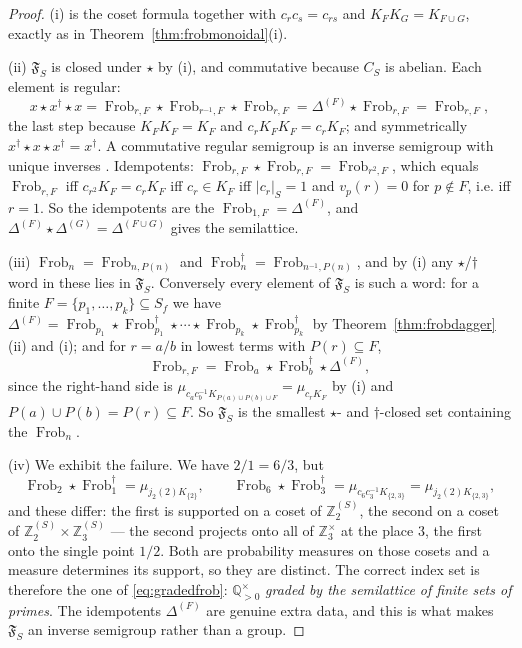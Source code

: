 \documentclass[11pt]{amsart}
\theoremstyle{definition}
\theoremstyle{remark}
\newcommand{\Z}{\mathbb Z}
\newcommand{\Q}{\mathbb Q}
\newcommand{\Frob}{\operatorname{Frob}}
\begin{document}
\begin{proof}
(i) is the coset formula together with $c_rc_s=c_{rs}$ and
$K_FK_G=K_{F\cup G}$, exactly as in Theorem~\ref{thm:frobmonoidal}(i).

(ii) $\mathfrak F_S$ is closed under $\star$ by (i), and commutative because
$C_S$ is abelian. Each element is regular:
\[
  x\star x^\dagger\star x=\Frob_{r,F}\star\Frob_{r^{-1},F}\star\Frob_{r,F}
   =\Delta^{(F)}\star\Frob_{r,F}=\Frob_{r,F},
\]
the last step because $K_FK_F=K_F$ and $c_rK_FK_F=c_rK_F$; and symmetrically
$x^\dagger\star x\star x^\dagger=x^\dagger$. A commutative regular semigroup is
an inverse semigroup with unique inverses \cite{Lawson}. Idempotents:
$\Frob_{r,F}\star\Frob_{r,F}=\Frob_{r^2,F}$, which equals $\Frob_{r,F}$ iff
$c_{r^2}K_F=c_rK_F$ iff $c_r\in K_F$ iff $|c_r|_S=1$ and $v_p(r)=0$ for
$p\notin F$, i.e. iff $r=1$. So the idempotents are the
$\Frob_{1,F}=\Delta^{(F)}$, and $\Delta^{(F)}\star\Delta^{(G)}
=\Delta^{(F\cup G)}$ gives the semilattice.

(iii) $\Frob_n=\Frob_{n,P(n)}$ and $\Frob_n^\dagger=\Frob_{n^{-1},P(n)}$, and
by (i) any $\star$/$\dagger$ word in these lies in $\mathfrak F_S$.
Conversely every element of $\mathfrak F_S$ is such a word: for a finite
$F=\{p_1,\dots,p_k\}\subseteq S_f$ we have
$\Delta^{(F)}=\Frob_{p_1}\star\Frob_{p_1}^\dagger\star\cdots\star
\Frob_{p_k}\star\Frob_{p_k}^\dagger$ by Theorem~\ref{thm:frobdagger}(ii) and
(i); and for $r=a/b$ in lowest terms with $P(r)\subseteq F$,
\[
  \Frob_{r,F}=\Frob_a\star\Frob_b^\dagger\star\Delta^{(F)},
\]
since the right-hand side is $\mu_{c_ac_b^{-1}K_{P(a)\cup P(b)\cup F}}
=\mu_{c_rK_F}$ by (i) and $P(a)\cup P(b)=P(r)\subseteq F$. So
$\mathfrak F_S$ is the smallest $\star$- and $\dagger$-closed set containing
the $\Frob_n$.

(iv) We exhibit the failure. We have $2/1=6/3$, but
\[
  \Frob_2\star\Frob_1^\dagger=\mu_{j_2(2)K_{\{2\}}},\qquad
  \Frob_6\star\Frob_3^\dagger=\mu_{c_6c_3^{-1}K_{\{2,3\}}}
   =\mu_{j_2(2)K_{\{2,3\}}},
\]
and these differ: the first is supported on a coset of $\Z_2^{(S)}$, the second
on a coset of $\Z_2^{(S)}\times\Z_3^{(S)}$ --- the second projects onto all of
$\Z_3^\times$ at the place $3$, the first onto the single point $1/2$. Both are
probability measures on those cosets and a measure determines its support, so
they are distinct. The correct index set is therefore the one of
\eqref{eq:gradedfrob}: $\Q_{>0}^\times$ \emph{graded by the semilattice of
finite sets of primes}.  The idempotents $\Delta^{(F)}$ are genuine extra
data, and this is what makes $\mathfrak F_S$ an inverse semigroup rather than
a group.
\end{proof}
\end{document}
